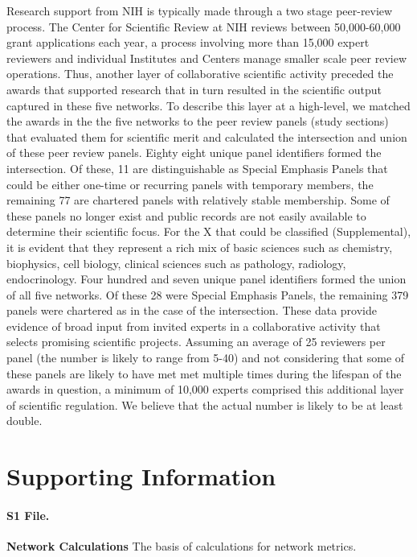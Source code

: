 \documentclass[10pt,letterpaper]{article}
\begin{document}
Research support from NIH is typically made through a two stage peer-review process.  The Center for Scientific Review at NIH reviews between 50,000-60,000 grant applications each year\cite{bibBoyack}, a process involving more than 15,000 expert reviewers and individual Institutes and Centers manage smaller scale peer review operations. Thus, another layer of collaborative scientific activity preceded the awards that supported research that in turn resulted in the scientific output captured in these five networks. To describe this layer at a high-level, we matched the awards in the the five networks to the peer review panels (study sections) that evaluated them for scientific merit and calculated the intersection and union of these peer review panels. Eighty eight unique panel identifiers formed the intersection. Of these, 11 are distinguishable as Special Emphasis Panels that could be either one-time or recurring panels with temporary members, the remaining 77 are chartered panels with relatively stable membership. Some of these panels no longer exist and public records are not easily available to determine their scientific focus. For the X that could be classified (Supplemental), it is evident that they represent a rich mix of basic sciences such as chemistry, biophysics, cell biology, clinical sciences such as pathology, radiology, endocrinology. Four hundred and seven unique panel identifiers formed the union of all five networks. Of these 28 were Special Emphasis Panels, the remaining 379 panels were chartered as in the case of the intersection. These data provide evidence of broad input from invited experts in a collaborative activity that selects promising scientific projects. Assuming an average of 25 reviewers per panel (the number is likely to range from 5-40) and not considering that some of these panels are likely to have met met multiple times during the lifespan of the awards in question, a minimum of 10,000 experts comprised this additional layer of scientific regulation. We believe that the actual number is likely to be at least double.  

\section*{Supporting Information}

\paragraph*{S1 File.}
\label{S1_File}
{\bf Network Calculations} The basis of calculations for network metrics.
\end{document}

